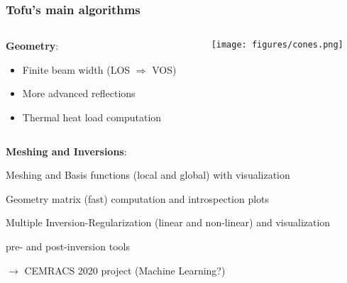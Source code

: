 \documentclass[10pt]{beamer}
\begin{document}
\begin{frame}
\frametitle{Tofu's main algorithms}


\begin{columns}
\begin{column}{0.6\textwidth}
\textbf{Geometry}:
	\begin{itemize}
	\item Finite beam width (LOS $\Rightarrow$ VOS)
	\item More advanced reflections
	\item Thermal heat load computation
	\end{itemize}
\end{column}
\begin{column}{0.4\textwidth}

\begin{center}
	\hspace{-0.5cm}\texttt{[image: figures/cones.png]}
\end{center}
\end{column}
\end{columns}

\vspace{0.2cm}
\textbf{Meshing and Inversions}:
\begin{itemize}
	\item Meshing and Basis functions (local and global) with visualization
	
	\item Geometry matrix (fast) computation and introspection plots
	\item \textcolor{myblue}{Multiple Inversion-Regularization (linear and non-linear) and visualization
	\item pre- and post-inversion tools}
\end{itemize}
\begin{alertblock}{$\longrightarrow$ CEMRACS 2020 project (Machine Learning?)}
\end{alertblock}

\end{frame}
\end{document}

